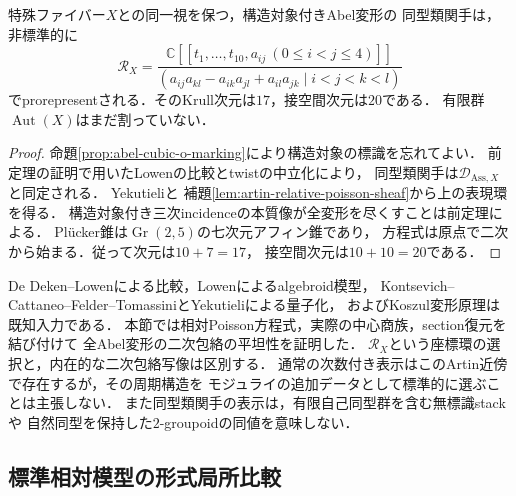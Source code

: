 \begin{corollary}[構造対象付きAbel変形の形式局所環]
\label{cor:abel-cubic-formal-ring}
特殊ファイバー$X$との同一視を保つ，構造対象付きAbel変形の
同型類関手は，非標準的に
\[
 \mathcal R_X=
 \frac{\mathbb C[[t_1,\ldots,t_{10},a_{ij}\ (0\le i<j\le4)]]}
 {(a_{ij}a_{kl}-a_{ik}a_{jl}+a_{il}a_{jk}\mid i<j<k<l)}
\]
でprorepresentされる．そのKrull次元は$17$，接空間次元は$20$である．
有限群$\operatorname{Aut}(X)$はまだ割っていない．
\end{corollary}
\begin{proof}
命題\ref{prop:abel-cubic-o-marking}により構造対象の標識を忘れてよい．
前定理の証明で用いたLowenの比較とtwistの中立化により，
同型類関手は$\mathcal D_{\mathrm{Ass},X}$と同定される．
Yekutieli\cite[Corollary~11.2]{YekutieliTwisted}と
補題\ref{lem:artin-relative-poisson-sheaf}から上の表現環を得る．
構造対象付き三次incidenceの本質像が全変形を尽くすことは前定理による．
Pl\"ucker錐は$\operatorname{Gr}(2,5)$の七次元アフィン錐であり，
方程式は原点で二次から始まる．従って次元は$10+7=17$，
接空間次元は$10+10=20$である．
\end{proof}

\begin{remark}
De Deken--Lowenによる比較，Lowenによるalgebroid模型，
Kontsevich--Cattaneo--Felder--TomassiniとYekutieliによる量子化，
およびKoszul変形原理は既知入力である．
本節では相対Poisson方程式，実際の中心商族，section復元を結び付けて
全Abel変形の二次包絡の平坦性を証明した．
$\mathcal R_X$という座標環の選択と，内在的な二次包絡写像は区別する．
通常の次数付き表示はこのArtin近傍で存在するが，その周期構造を
モジュライの追加データとして標準的に選ぶことは主張しない．
また同型類関手の表示は，有限自己同型群を含む無標識stackや
自然同型を保持した$2$-groupoidの同値を意味しない．
\end{remark}

\subsection{標準相対模型の形式局所比較}

